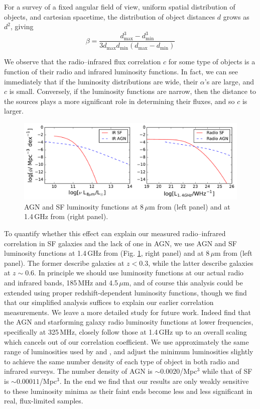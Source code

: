 \documentclass[numberedappendix]{emulateapj}
\newcommand{\mintext}{\text{min}}
\newcommand{\maxtext}{\text{max}}
\begin{document}
For a survey of a fixed angular field of view, uniform spatial distribution of objects, and cartesian spacetime, the distribution of object distances $d$ grows as $d^2$, giving 
\begin{equation}
	\beta=\frac{d_\maxtext^3-d_\mintext^3}{3d_\maxtext d_\mintext (d_\maxtext-d_\mintext)}
\end{equation}

We observe that the radio--infrared flux correlation $c$ for some type of objects is a function of their radio and infrared luminosity functions. In fact, we can see immediately that if the luminosity distributions are wide, their $\alpha$'s are large, and $c$ is small. Conversely, if the luminosity functions are narrow, then the distance to the sources plays a more significant role in determining their fluxes, and so $c$ is larger. 

\begin{figure}[h]
\centering
\includegraphics[width=6in]{chap5_xcor/sim_rad_ir_luminosity_functions.pdf}
\caption{AGN and SF luminosity functions at 8\,$\mu$m from \citet{fu10} (left panel) and at 1.4\,GHz from \citet{mauch07} (right panel).}
\label{fig:luminosityfunctions}
\end{figure}

To quantify whether this effect can explain our measured radio--infrared correlation in SF galaxies and the lack of one in AGN, we use AGN and SF luminosity functions at 1.4\,GHz from \citet{mauch07} (Fig. \ref{fig:luminosityfunctions}, right panel) and at 8\,$\mu$m from \citet{fu10} (left panel). The former describe galaxies at $z<0.3$, while the latter describe galaxies at $z\sim0.6$. In principle we should use luminosity functions at our actual radio and infrared bands, 185\,MHz and 4.5\,$\mu$m, and of course this analysis could be extended using proper redshift-dependent luminosity functions, though we find that our simplified analysis suffices to explain our earlier correlation measurements. We leave a more detailed study for future work. Indeed \citet{prescott16} find that the AGN and starforming galaxy radio luminosity functions at lower frequencies, specifically at 325\,MHz, closely follow those at 1.4\,GHz up to an overall scaling which cancels out of our correlation coefficient. We use approximately the same range of luminosities used by \citet{mauch07} and \citet{fu10}, and adjust the minimum luminosities slightly to achieve the same number density of each type of object in both radio and infrared surveys. The number density of AGN is $\sim0.0020$/Mpc$^3$ while that of SF is $\sim0.00011$/Mpc$^3$. In the end we find that our results are only weakly sensitive to these luminosity minima as their faint ends become less and less significant in real, flux-limited samples. 
\end{document}
